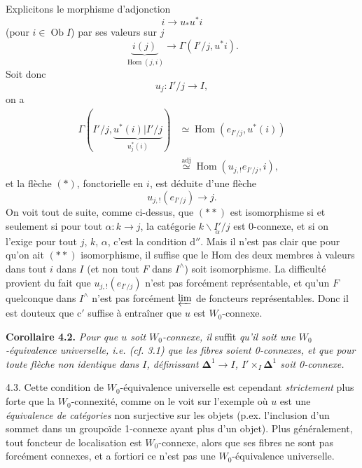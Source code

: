 \documentclass[11pt]{article}
\newcommand{\printedpage}[1]{\marginpar{\footnotesize p.~#1}}
\def\dcprintedpending{}
\newcommand{\msp}[1]{\marginpar{\footnotesize\raggedright
  \ifx\dcprintedpending\empty\else p.~\dcprintedpending\par\fi
  [#1]}\gdef\dcprintedpending{}}
\newcommand{\Hom}{\operatorname{Hom}}
\newcommand{\Ob}{\operatorname{Ob}}
\newcommand{\bDelta}{\boldsymbol{\Delta}}
\begin{document}
\msp{page 55}Explicitons le morphisme d'adjonction
\[
i \longrightarrow u_*u^*i
\]
(pour $i \in \Ob I$) par ses valeurs sur $j$
\[
\underbrace{i(j)}_{\Hom(j,i)} \longrightarrow \Gamma(I'/j, u^*i). \tag*{$(\ast)$}
\]
Soit donc
\[
u_j : I'/j \longrightarrow I,
\]
\printedpage{35}
on a
\[
\begin{aligned}
\Gamma(I'/j, \underbrace{u^*(i)|I'/j}_{u_j^*(i)}) &\simeq \Hom(e_{I'/j}, u^*(i)) \\ %
&\overset{\mathrm{adj}}{\simeq} \Hom(u_{j,!}e_{I'/j}, i),
\end{aligned}
\]
et la flèche $(\ast)$, fonctorielle en $i$, est déduite d'une flèche
\[
u_{j,!}(e_{I'/j}) \longrightarrow j. \tag*{$(\ast\ast)$}
\]
On voit tout de suite, comme ci-dessus, que $(\ast\ast)$ est isomorphisme si et seulement si pour tout $\alpha : k \longrightarrow j$, la catégorie $k\backslash\underset{\alpha}{I'}/j$ est 0-connexe, et si on l'exige pour tout $j$, $k$, $\alpha$, c'est la condition d$''$. Mais il n'est pas clair que pour qu'on ait $(\ast\ast)$ isomorphisme, il suffise que le Hom des deux membres à valeurs dans tout $i$ dans $I$ (et non tout $F$ dans $I^{\wedge}$) soit isomorphisme. La difficulté provient du fait que $u_{j,!}(e_{I'/j})$ n'est pas forcément représentable, et qu'un $F$ quelconque dans $I^{\wedge}$ \msp{page 56}n'est pas forcément $\varprojlim$ de foncteurs représentables. Donc il est douteux que c$'$ suffise à entraîner que $u$ est $W_0$-connexe.

\textbf{Corollaire 4.2.} \textit{Pour que $u$ soit $W_0$-connexe, il} suffit \textit{qu'il soit une $W_0$-équivalence universelle, i.e. (cf. 3.1) que les fibres soient \textup{0}-connexes, et que pour toute flèche non identique dans $I$, définissant $\bDelta^1 \longrightarrow I$, $I' \times_I \bDelta^1$ soit \textup{0}-connexe.}

4.3. Cette condition de $W_0$-équivalence universelle est cependant \textit{strictement} plus forte que la $W_0$-connexité, comme on le voit sur l'exemple où $u$ est une \textit{équivalence de catégories} non surjective sur les objets (p.ex. l'inclusion d'un sommet dans un groupoïde 1-connexe ayant plus d'un objet). Plus généralement, tout foncteur de localisation est $W_0$-connexe, alors que ses fibres ne sont pas forcément connexes, et a fortiori ce n'est pas une $W_0$-équivalence universelle.
\end{document}
